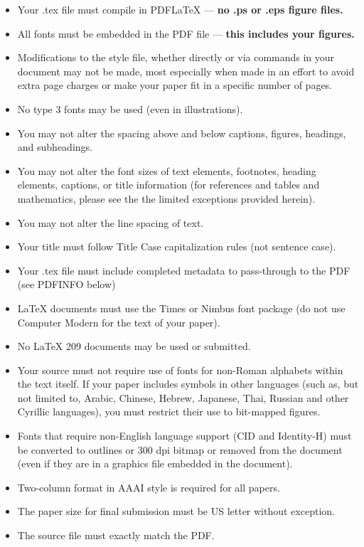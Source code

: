 \documentclass[letterpaper]{article} %
\begin{document}
\begin{itemize}
\item Your .tex file must compile in PDF\LaTeX{} --- \textbf{ no .ps or .eps figure files.}
\item All fonts must be embedded in the PDF file --- \textbf{ this includes your figures.}
\item Modifications to the style file, whether directly or via commands in your document may not be made, most especially when made in an effort to avoid extra page charges or make your paper fit in a specific number of pages.
\item No type 3 fonts may be used (even in illustrations).
\item You may not alter the spacing above and below captions, figures, headings, and subheadings.
\item You may not alter the font sizes of text elements, footnotes, heading elements, captions, or title information (for references and tables and mathematics, please see the the limited exceptions provided herein).
\item You may not alter the line spacing of text.
\item Your title must follow Title Case capitalization rules (not sentence case).
\item Your .tex file must include completed metadata to pass-through to the PDF (see PDFINFO below)
\item \LaTeX{} documents must use the Times or Nimbus font package (do not use Computer Modern for the text of your paper).
\item No \LaTeX{} 209 documents may be used or submitted.
\item Your source must not require use of fonts for non-Roman alphabets within the text itself. If your paper includes symbols in other languages (such as, but not limited to, Arabic, Chinese, Hebrew, Japanese, Thai, Russian and other Cyrillic languages), you must restrict their use to bit-mapped figures.
\item Fonts that require non-English language support (CID and Identity-H) must be converted to outlines or 300 dpi bitmap or removed from the document (even if they are in a graphics file embedded in the document). 
\item Two-column format in AAAI style is required for all papers.
\item The paper size for final submission must be US letter without exception.
\item The source file must exactly match the PDF.

\end{itemize}
\end{document}
